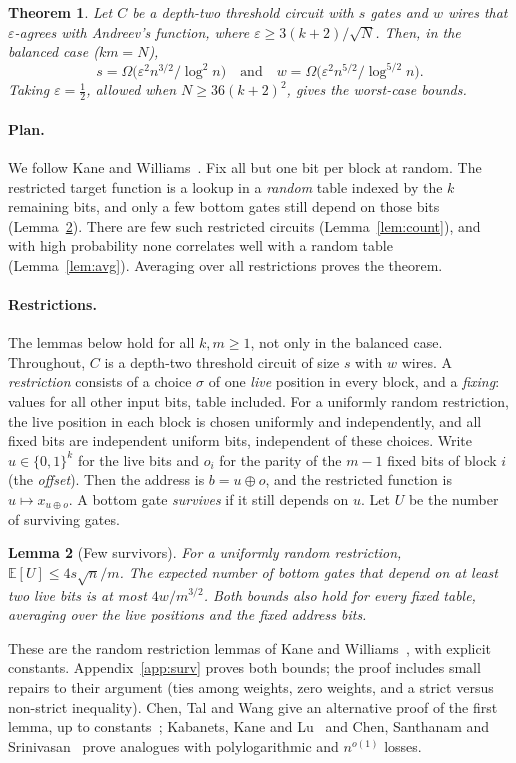 \documentclass[11pt,letterpaper]{article}
\newtheorem{theorem}{Theorem}
\newtheorem{lemma}[theorem]{Lemma}
\theoremstyle{remark}
\newcommand{\bits}{\{0,1\}}
\begin{document}
\begin{theorem}\label{thm:lower}
Let $C$ be a depth-two threshold circuit with $s$
gates and $w$ wires that $\varepsilon$-agrees with Andreev's function, where
$\varepsilon\ge3(k+2)/\sqrt N$. Then, in the balanced case ($km=N$),
\[
s=\Omega\bigl(\varepsilon^2n^{3/2}/\log^2n\bigr)
\quad\text{and}\quad
w=\Omega\bigl(\varepsilon^2n^{5/2}/\log^{5/2}n\bigr).
\]
Taking $\varepsilon=\tfrac12$,
allowed when $N\ge36(k+2)^2$, gives the worst-case bounds.
\end{theorem}

\paragraph*{Plan.}
We follow Kane and Williams~\cite{KW}. Fix all but one bit per block at
random. The restricted target function is a lookup in a \emph{random} table
indexed by the $k$ remaining bits, and only a few bottom gates still depend
on those bits (Lemma~\ref{lem:surv}). There are few such restricted circuits
(Lemma~\ref{lem:count}), and with high probability none correlates well with a random
table (Lemma~\ref{lem:avg}). Averaging over all restrictions proves the
theorem.

\paragraph*{Restrictions.}
The lemmas below hold for all $k,m\ge1$, not only in the balanced case.
Throughout, $C$ is a depth-two threshold circuit of size $s$ with $w$ wires.
A \emph{restriction} consists of a choice $\sigma$ of one \emph{live}
position in every block, and a \emph{fixing}: values for all other input
bits, table included. For a uniformly random restriction, the live position
in each block is
chosen uniformly and independently, and all fixed bits are independent
uniform bits, independent of these choices. Write $u\in\bits^k$ for the
live bits and
$o_i$ for the parity of the $m-1$ fixed bits of block $i$ (the
\emph{offset}). Then the address is $b=u\oplus o$, and the restricted
function is $u\mapsto x_{u\oplus o}$. A bottom gate \emph{survives} if it
still depends on $u$. Let $U$ be the number of surviving gates.

\begin{lemma}[Few survivors]\label{lem:surv}
For a uniformly random restriction, $\mathbb E[U]\le4s\sqrt n/m$. The
expected number of bottom gates that depend on at least two live bits is at
most $4w/m^{3/2}$. Both bounds also hold for every fixed table, averaging
over the live
positions and the fixed address bits.
\end{lemma}
These are the random restriction lemmas of Kane and
Williams~\cite[Lemmas~1.1 and~3.1]{KW}, with explicit constants.
Appendix~\ref{app:surv} proves both bounds; the proof includes small repairs
to their argument (ties among weights, zero weights, and a strict
versus non-strict inequality). Chen, Tal and Wang give an alternative proof
of the first lemma, up to constants~\cite[App.~A.3]{CTW}; Kabanets, Kane and
Lu~\cite[Lemma~6.1]{KKL} and Chen, Santhanam and
Srinivasan~\cite[Lemma~9.1]{CSS} prove analogues with polylogarithmic and
$n^{o(1)}$ losses.
\end{document}
